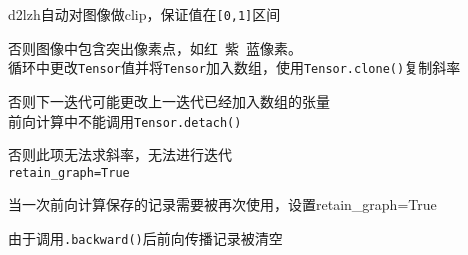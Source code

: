 \documentclass[UTF8]{ctexart}
\begin{document}
  d2lzh自动对图像做clip，保证值在\texttt{[0,1]}区间
  
  否则图像中包含突出像素点，如红\ 紫\ 蓝像素。\\
循环中更改\texttt{Tensor}值并将\texttt{Tensor}加入数组，使用\texttt{Tensor.clone()}复制斜率

  否则下一迭代可能更改上一迭代已经加入数组的张量\\
前向计算中不能调用\texttt{Tensor.detach()}

  否则此项无法求斜率，无法进行迭代\\
\texttt{retain\_graph=True}

  当一次前向计算保存的记录需要被再次使用，设置retain\_graph=True 

  由于调用\texttt{.backward()}后前向传播记录被清空
\end{document}
